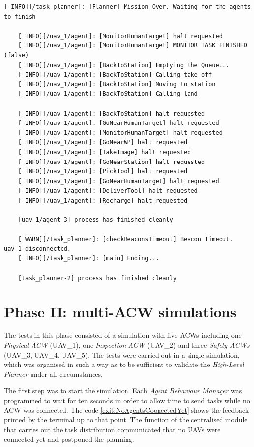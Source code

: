 \begin{lstlisting}[caption={Feedback messages printed after mission over signal}, breaklines=true, label=exit:event_MissionOver]
    [ INFO][/task_planner]: [Planner] Mission Over. Waiting for the agents to finish

    [ INFO][/uav_1/agent]: [MonitorHumanTarget] halt requested
    [ INFO][/uav_1/agent]: [MonitorHumanTarget] MONITOR TASK FINISHED (false)
    [ INFO][/uav_1/agent]: [BackToStation] Emptying the Queue...
    [ INFO][/uav_1/agent]: [BackToStation] Calling take_off
    [ INFO][/uav_1/agent]: [BackToStation] Moving to station
    [ INFO][/uav_1/agent]: [BackToStation] Calling land

    [ INFO][/uav_1/agent]: [BackToStation] halt requested
    [ INFO][/uav_1/agent]: [GoNearHumanTarget] halt requested
    [ INFO][/uav_1/agent]: [MonitorHumanTarget] halt requested
    [ INFO][/uav_1/agent]: [GoNearWP] halt requested
    [ INFO][/uav_1/agent]: [TakeImage] halt requested
    [ INFO][/uav_1/agent]: [GoNearStation] halt requested
    [ INFO][/uav_1/agent]: [PickTool] halt requested
    [ INFO][/uav_1/agent]: [GoNearHumanTarget] halt requested
    [ INFO][/uav_1/agent]: [DeliverTool] halt requested
    [ INFO][/uav_1/agent]: [Recharge] halt requested

    [uav_1/agent-3] process has finished cleanly

    [ WARN][/task_planner]: [checkBeaconsTimeout] Beacon Timeout. uav_1 disconnected.
    [ INFO][/task_planner]: [main] Ending...
    
    [task_planner-2] process has finished cleanly
\end{lstlisting}

\section{Phase II: multi-ACW simulations}
\label{sec:phaseII}
The tests in this phase consisted of a simulation with five \glspl{ACW} including one \emph{Physical-ACW} (UAV\_1), one \emph{Inspection-ACW} (UAV\_2) and three \emph{Safety-ACWs} (UAV\_3, UAV\_4, UAV\_5). The tests were carried out in a single simulation, which was organised in such a way as to be sufficient to validate the \emph{High-Level Planner} under all circumstances.

The first step was to start the simulation. Each \emph{Agent Behaviour Manager} was programmed to wait for ten seconds in order to allow time to send tasks while no \gls{ACW} was connected. The code \ref{exit:NoAgentsCoonectedYet} shows the feedback printed by the terminal up to that point. The function of the centralised module that carries out the task distribution communicated that no \glspl{UAV} were connected yet and postponed the planning.

